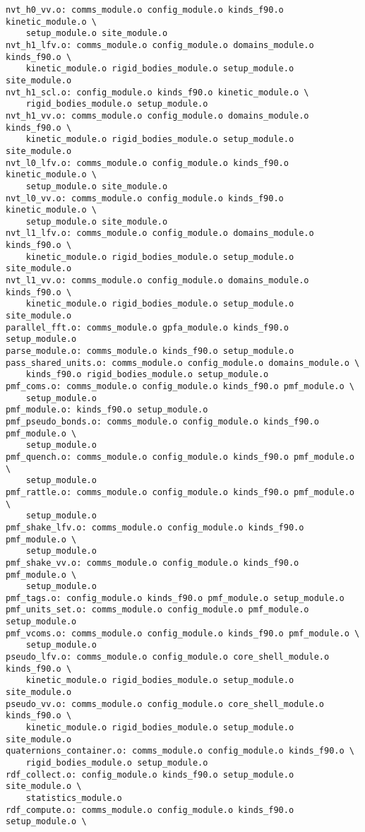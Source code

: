 \begin{verbatim}
nvt_h0_vv.o: comms_module.o config_module.o kinds_f90.o kinetic_module.o \
	setup_module.o site_module.o
nvt_h1_lfv.o: comms_module.o config_module.o domains_module.o kinds_f90.o \
	kinetic_module.o rigid_bodies_module.o setup_module.o site_module.o
nvt_h1_scl.o: config_module.o kinds_f90.o kinetic_module.o \
	rigid_bodies_module.o setup_module.o
nvt_h1_vv.o: comms_module.o config_module.o domains_module.o kinds_f90.o \
	kinetic_module.o rigid_bodies_module.o setup_module.o site_module.o
nvt_l0_lfv.o: comms_module.o config_module.o kinds_f90.o kinetic_module.o \
	setup_module.o site_module.o
nvt_l0_vv.o: comms_module.o config_module.o kinds_f90.o kinetic_module.o \
	setup_module.o site_module.o
nvt_l1_lfv.o: comms_module.o config_module.o domains_module.o kinds_f90.o \
	kinetic_module.o rigid_bodies_module.o setup_module.o site_module.o
nvt_l1_vv.o: comms_module.o config_module.o domains_module.o kinds_f90.o \
	kinetic_module.o rigid_bodies_module.o setup_module.o site_module.o
parallel_fft.o: comms_module.o gpfa_module.o kinds_f90.o setup_module.o
parse_module.o: comms_module.o kinds_f90.o setup_module.o
pass_shared_units.o: comms_module.o config_module.o domains_module.o \
	kinds_f90.o rigid_bodies_module.o setup_module.o
pmf_coms.o: comms_module.o config_module.o kinds_f90.o pmf_module.o \
	setup_module.o
pmf_module.o: kinds_f90.o setup_module.o
pmf_pseudo_bonds.o: comms_module.o config_module.o kinds_f90.o pmf_module.o \
	setup_module.o
pmf_quench.o: comms_module.o config_module.o kinds_f90.o pmf_module.o \
	setup_module.o
pmf_rattle.o: comms_module.o config_module.o kinds_f90.o pmf_module.o \
	setup_module.o
pmf_shake_lfv.o: comms_module.o config_module.o kinds_f90.o pmf_module.o \
	setup_module.o
pmf_shake_vv.o: comms_module.o config_module.o kinds_f90.o pmf_module.o \
	setup_module.o
pmf_tags.o: config_module.o kinds_f90.o pmf_module.o setup_module.o
pmf_units_set.o: comms_module.o config_module.o pmf_module.o setup_module.o
pmf_vcoms.o: comms_module.o config_module.o kinds_f90.o pmf_module.o \
	setup_module.o
pseudo_lfv.o: comms_module.o config_module.o core_shell_module.o kinds_f90.o \
	kinetic_module.o rigid_bodies_module.o setup_module.o site_module.o
pseudo_vv.o: comms_module.o config_module.o core_shell_module.o kinds_f90.o \
	kinetic_module.o rigid_bodies_module.o setup_module.o site_module.o
quaternions_container.o: comms_module.o config_module.o kinds_f90.o \
	rigid_bodies_module.o setup_module.o
rdf_collect.o: config_module.o kinds_f90.o setup_module.o site_module.o \
	statistics_module.o
rdf_compute.o: comms_module.o config_module.o kinds_f90.o setup_module.o \

\end{verbatim}
